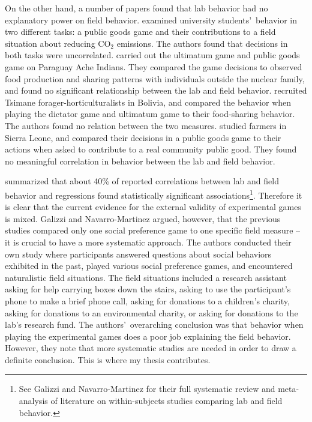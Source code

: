\documentclass[12pt]{article}
\begin{document}
On the other hand, a number of papers found that lab behavior had no explanatory power on field behavior. \cite{goeschl_2015} examined university students\rq \ behavior in two different tasks: a public goods game and their contributions to a field situation about reducing CO$_{2}$ emissions. The authors found that decisions in both tasks were uncorrelated. \cite{hill_gurven_2004} carried out the ultimatum game and public goods game on Paraguay Ache Indians. They compared the game decisions to observed food production and sharing patterns with individuals outside the nuclear family, and found no significant relationship between the lab and field behavior. \cite{gurven_winking_2008} recruited Tsimane forager-horticulturalists in Bolivia, and compared the behavior when playing the dictator game and ultimatum game to their food-sharing behavior. The authors found no relation between the two measures. \cite{voors_2012} studied farmers in Sierra Leone, and compared their decisions in a public goods game to their actions when asked to contribute to a real community public good. They found no meaningful correlation in behavior between the lab and field behavior. 

\cite{galizzi_navarro-martinez_2017} summarized that about 40\% of reported correlations between lab and field behavior and regressions found statistically significant associations\footnote{See Galizzi and Navarro-Martinez for their full systematic review and meta-analysis of literature on within-subjects studies comparing lab and field behavior.}. Therefore it is clear that the current evidence for the external validity of experimental games is mixed. Galizzi and Navarro-Martinez argued, however, that the previous studies compared only one social preference game to one specific field measure -- it is crucial to have a more systematic approach. The authors conducted their own study where participants answered questions about social behaviors exhibited in the past, played various social preference games, and encountered naturalistic field situations. The field situations included a research assistant asking for help carrying boxes down the stairs, asking to use the participant\rq s phone to make a brief phone call, asking for donations to a children\rq s charity, asking for donations to an environmental charity, or asking for donations to the lab\rq s research fund.  The authors\rq \ overarching conclusion was that behavior when playing the experimental games does a poor job explaining the field behavior. However, they note that more systematic studies are needed in order to draw a definite conclusion. This is where my thesis contributes.
\end{document}
